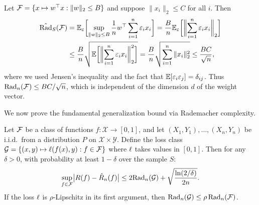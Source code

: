 \documentclass[11pt,a4paper]{article}
\begin{document}
\begin{example}
\label{ex:rad-linear}
Let $\mathcal{F} = \{x \mapsto w^\top x : \|w\|_2 \le B\}$ and suppose
$\|x_i\|_2 \le C$ for all $i$.  Then
\begin{align*}
  \hat{\mathrm{Rad}}_S(\mathcal{F})
  &= \mathbb{E}_\varepsilon\biggl[
    \sup_{\|w\|_2 \le B} \frac{1}{n}
    w^\top \sum_{i=1}^n \varepsilon_i x_i \biggr]
  = \frac{B}{n} \mathbb{E}_\varepsilon\biggl[
    \biggl\| \sum_{i=1}^n \varepsilon_i x_i \biggr\|_2 \biggr] \\
  &\le \frac{B}{n} \sqrt{\mathbb{E}\biggl[
    \biggl\| \sum_{i=1}^n \varepsilon_i x_i \biggr\|_2^2 \biggr]}
  = \frac{B}{n} \sqrt{\sum_{i=1}^n \|x_i\|_2^2}
  \le \frac{BC}{\sqrt{n}},
\end{align*}
where we used Jensen's inequality and the fact that
$\mathbb{E}[\varepsilon_i \varepsilon_j] = \delta_{ij}$.  Thus
$\mathrm{Rad}_n(\mathcal{F}) \le BC / \sqrt{n}$, which is independent of
the dimension $d$ of the weight vector.
\end{example}

We now prove the fundamental generalization bound via Rademacher
complexity.

\begin{theorem}
\label{thm:rademacher-bound}
Let $\mathcal{F}$ be a class of functions $f \colon \mathcal{X} \to [0,1]$,
and let $(X_1, Y_1), \ldots, (X_n, Y_n)$ be i.i.d.\ from a
distribution $P$ on $\mathcal{X} \times \mathcal{Y}$.  Define the
loss class $\mathcal{G} = \{(x,y) \mapsto \ell(f(x), y) :
f \in \mathcal{F}\}$ where $\ell$ takes values in $[0, 1]$.  Then
for any $\delta > 0$, with probability at least $1 - \delta$ over
the sample $S$:
\[
  \sup_{f \in \mathcal{F}} \bigl| R(f) - \hat{R}_n(f) \bigr|
  \le 2 \mathrm{Rad}_n(\mathcal{G})
  + \sqrt{\frac{\ln(2/\delta)}{2n}}.
\]
If the loss $\ell$ is $\rho$-Lipschitz in its first argument, then
$\mathrm{Rad}_n(\mathcal{G}) \le \rho \, \mathrm{Rad}_n(\mathcal{F})$.
\end{theorem}
\end{document}
